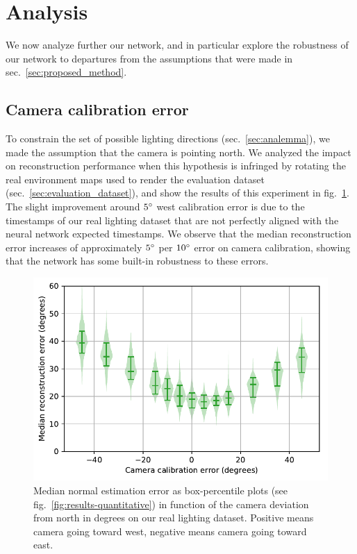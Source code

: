 \section{Analysis}
\label{sec:analysis}

We now analyze further our network, and in particular explore the robustness of our network to departures from the assumptions that were made in sec.~\ref{sec:proposed_method}. 

\subsection{Camera calibration error}

To constrain the set of possible lighting directions (sec.~\ref{sec:analemma}), we made the assumption that the camera is pointing north. We analyzed the impact on reconstruction performance when this hypothesis is infringed by rotating the real environment maps used to render the evaluation dataset (sec.~\ref{sec:evaluation_dataset}), and show the results of this experiment in fig.~\ref{fig:calibration_error_performance}. The slight improvement around $5^{\circ}$ west calibration error is due to the timestamps of our real lighting dataset that are not perfectly aligned with the neural network expected timestamps. We observe that the median reconstruction error increases of approximately $5^{\circ}$ per $10^{\circ}$ error on camera calibration, showing that the network has some built-in robustness to these errors. 


\begin{figure}[!t]
\centering
\includegraphics[width=0.7\linewidth]{figures/analysis/performance_calibration_error.pdf}
\caption{Median normal estimation error as box-percentile plots (see fig.~\ref{fig:results-quantitative}) in function of the camera deviation from north in degrees on our real lighting dataset. Positive means camera going toward west, negative means camera going toward east. }
\label{fig:calibration_error_performance}
\end{figure}


